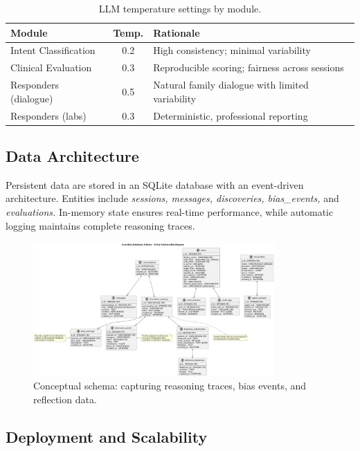 \begin{table}[h]
\centering
\caption{LLM temperature settings by module.}
\label{tab:temps}
\setlength{\tabcolsep}{8pt}
\renewcommand{\arraystretch}{1.12}
\begin{tabular}{l c p{7cm}}
\toprule
\textbf{Module} & \textbf{Temp.} & \textbf{Rationale} \\
\midrule
Intent Classification & 0.2 & High consistency; minimal variability \\
Clinical Evaluation & 0.3 & Reproducible scoring; fairness across sessions \\
Responders (dialogue) & 0.5 & Natural family dialogue with limited variability \\
Responders (labs) & 0.3 & Deterministic, professional reporting \\
\bottomrule
\end{tabular}
\end{table}

\subsection{Data Architecture}

Persistent data are stored in an SQLite database with an event-driven
architecture.
Entities include \textit{sessions, messages, discoveries, bias\_events,}
and \textit{evaluations.}
In-memory state ensures real-time performance, while automatic logging
maintains complete reasoning traces.

\begin{figure}[h]
\centering
\includegraphics[width=0.82\textwidth]{figures/diagrams/erdb.png}
\caption{Conceptual schema: capturing reasoning traces, bias events, and reflection data.}
\label{fig:db_schema}
\end{figure}

\subsection{Deployment and Scalability}

